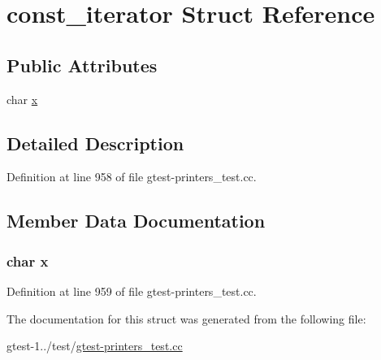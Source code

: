 \hypertarget{structtesting_1_1gtest__printers__test_1_1const__iterator}{\section{const\-\_\-iterator \-Struct \-Reference}
\label{d7/d1d/structtesting_1_1gtest__printers__test_1_1const__iterator}
}
\subsection*{\-Public \-Attributes}
\begin{DoxyCompactItemize}
\item 
char \hyperlink{structtesting_1_1gtest__printers__test_1_1const__iterator_ab06e9aa782b61ccfb42f7c48996f6ed4}{x}
\end{DoxyCompactItemize}


\subsection{\-Detailed \-Description}


\-Definition at line 958 of file gtest-\/printers\-\_\-test.\-cc.



\subsection{\-Member \-Data \-Documentation}
\hypertarget{structtesting_1_1gtest__printers__test_1_1const__iterator_ab06e9aa782b61ccfb42f7c48996f6ed4}{
\subsubsection[{x}]{\setlength{\rightskip}{0pt plus 5cm}char {\bf x}}}\label{d7/d1d/structtesting_1_1gtest__printers__test_1_1const__iterator_ab06e9aa782b61ccfb42f7c48996f6ed4}


\-Definition at line 959 of file gtest-\/printers\-\_\-test.\-cc.



\-The documentation for this struct was generated from the following file\-:\begin{DoxyCompactItemize}
\item 
gtest-\/1../test/\hyperlink{gtest-printers__test_8cc}{gtest-\/printers\-\_\-test.\-cc}\end{DoxyCompactItemize}
